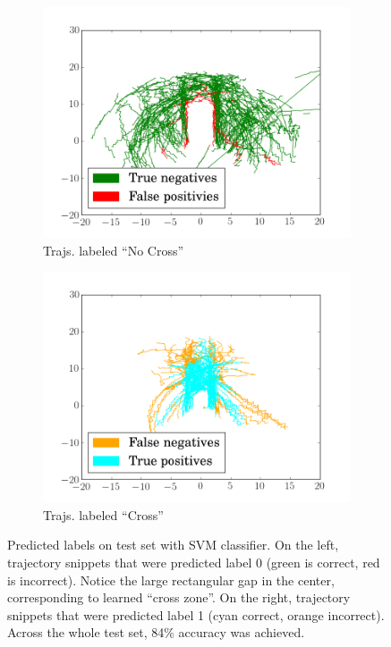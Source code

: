 \begin{figure}
\centering
\begin{subfigure}{.25\textwidth}
  \centering
  \includegraphics[width=.9\linewidth]{figures/svm_label0}
  \caption{Trajs. labeled ``No Cross''}
  \label{fig:svm_label0}
\end{subfigure}%
\begin{subfigure}{.25\textwidth}
  \centering
  \includegraphics[width=.9\linewidth]{figures/svm_label1}
  \caption{Trajs. labeled ``Cross''}
  \label{fig:svm_label1}
\end{subfigure}
\caption{Predicted labels on test set with SVM classifier. On the left, trajectory snippets that were predicted label 0 (green is correct, red is incorrect). Notice the large rectangular gap in the center, corresponding to learned ``cross zone''. On the right, trajectory snippets that were predicted label 1 (cyan correct, orange incorrect). Across the whole test set, 84\% accuracy was achieved.}
\label{fig:svm_labels}
\end{figure}

